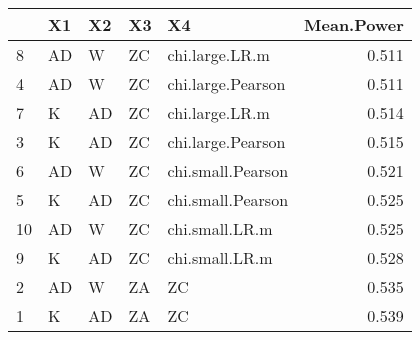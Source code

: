 \documentclass[
]{article}
\begin{document}
\begin{table}[H]
\centering\begingroup\fontsize{15}{17}\selectfont

\begin{tabular}{l|l|l|l|l|r}
\hline
  & X1 & X2 & X3 & X4 & Mean.Power\\
\hline
8 & AD & W & ZC & chi.large.LR.m & 0.511\\
\hline
4 & AD & W & ZC & chi.large.Pearson & 0.511\\
\hline
7 & K & AD & ZC & chi.large.LR.m & 0.514\\
\hline
3 & K & AD & ZC & chi.large.Pearson & 0.515\\
\hline
6 & AD & W & ZC & chi.small.Pearson & 0.521\\
\hline
5 & K & AD & ZC & chi.small.Pearson & 0.525\\
\hline
10 & AD & W & ZC & chi.small.LR.m & 0.525\\
\hline
9 & K & AD & ZC & chi.small.LR.m & 0.528\\
\hline
2 & AD & W & ZA & ZC & 0.535\\
\hline
1 & K & AD & ZA & ZC & 0.539\\
\hline
\end{tabular}
\endgroup{}
\end{table}
\end{document}
